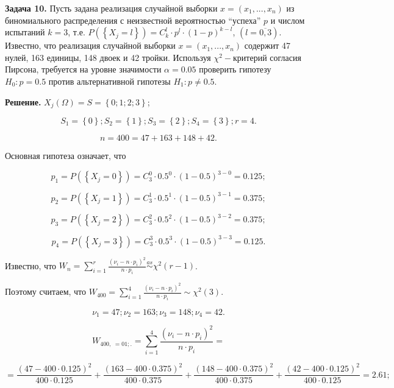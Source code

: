 \textbf{Задача 10.} Пусть задана реализация случайной выборки $x=\left(x_{1} ,...,x_{n} \right)$ из биномиального распределения с неизвестной вероятностью ``успеха'' $p$ и числом испытаний $k=3$, т.е. $P\left(\left\{X_{j} =l\right\}\right)=C_{k}^{l} \cdot p^{l} \cdot \left(1-p\right)^{k-l} $, $\left(l=\overline{0,3}\right)$. Известно, что реализация случайной выборки $x=\left(x_{1} ,...,x_{n} \right)$ содержит 47 нулей, 163 единицы, 148 двоек и 42 тройки. Используя $\chi ^{2} -$критерий согласия Пирсона, требуется на уровне значимости $\alpha =0.05$ проверить гипотезу $H_{0} :p=0.5$ против альтернативной гипотезы $H_{1} :p\ne 0.5$.

\textbf{Решение.} $X_{j} \left(\Omega \right)=S=\left\{0;1;2;3\right\}$;

\[S_{1} =\left\{0\right\}; S_{2} =\left\{1\right\}; S_{3} =\left\{2\right\}; S_{4} =\left\{3\right\}; r=4.\] 

\[n=400=47+163+148+42.\] 

Основная гипотеза означает, что

\[p_{1} =P\left(\left\{X_{j} =0\right\}\right)=C_{3}^{0} \cdot 0.5^{0} \cdot \left(1-0.5\right)^{3-0} =0.125;\] 

\[p_{2} =P\left(\left\{X_{j} =1\right\}\right)=C_{3}^{1} \cdot 0.5^{1} \cdot \left(1-0.5\right)^{3-1} =0.375;\] 

\[p_{3} =P\left(\left\{X_{j} =2\right\}\right)=C_{3}^{2} \cdot 0.5^{2} \cdot \left(1-0.5\right)^{3-2} =0.375;\] 

\[p_{4} =P\left(\left\{X_{j} =3\right\}\right)=C_{3}^{3} \cdot 0.5^{3} \cdot \left(1-0.5\right)^{3-3} =0.125.\] 

Известно, что $W_{n} =\sum _{i=1}^{r}\frac{\left(\nu _{i} -n\cdot p_{i} \right)^{2} }{n\cdot p_{i} }  \mathop{\sim }\limits^{as} \chi ^{2} \left(r-1\right)$.

Поэтому считаем, что $W_{400} =\sum _{i=1}^{4}\frac{\left(\nu _{i} -n\cdot p_{i} \right)^{2} }{n\cdot p_{i} }  \sim \chi ^{2} \left(3\right)$.

\[\nu _{1} =47; \nu _{2} =163; \nu _{3} =148; \nu _{4} =42.\] 

\[W_{400,\; =01;.} =\sum _{i=1}^{4}\frac{\left(\nu _{i} -n\cdot p_{i} \right)^{2} }{n\cdot p_{i} }  =\] 

\[=\frac{\left(47-400\cdot 0.125\right)^{2} }{400\cdot 0.125} +\frac{\left(163-400\cdot 0.375\right)^{2} }{400\cdot 0.375} +\frac{\left(148-400\cdot 0.375\right)^{2} }{400\cdot 0.375} +\frac{\left(42-400\cdot 0.125\right)^{2} }{400\cdot 0.125} =2.61;\] 

